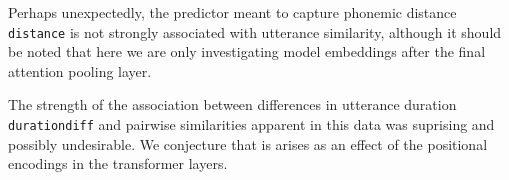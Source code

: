 Perhaps unexpectedly, the predictor meant to capture phonemic distance
{\tt distance} is not strongly associated with utterance similarity,
although it should be noted that here we are only investigating model
embeddings after the final attention pooling layer.

The strength of the association between differences in utterance
duration {\tt durationdiff} and pairwise similarities apparent in this
data was suprising and possibly undesirable. We conjecture that is
arises as an effect of the positional encodings in the transformer
layers.

